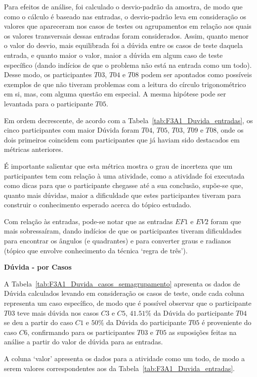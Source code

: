 Para efeitos de análise, foi calculado o desvio-padrão da amostra, de modo que como o cálculo é baseado nas entradas, o desvio-padrão leva em consideração os valores que apareceram nos casos de testes ou agrupamentos em relação aos quais os valores transversais dessas entradas foram considerados. Assim, quanto menor o valor do desvio, mais equilibrada foi a dúvida entre os casos de teste daquela entrada, e quanto maior o valor, maior a dúvida em algum caso de teste específico (dando indícios de que o problema não está na entrada como um todo). Desse modo, os participantes $T03$, $T04$ e $T08$ podem ser apontados como possíveis exemplos de que não tiveram problemas com a leitura do círculo trigonométrico em si, mas, com alguma questão em especial. A mesma hipótese pode ser levantada para o participante $T05$.

Em ordem decrescente, de acordo com a Tabela~\ref{tab:F3A1_Duvida_entradas}, os cinco participantes com maior Dúvida foram $T04$, $T05$, $T03$, $T09$ e $T08$, onde os dois primeiros coincidem com participantes que já haviam sido destacados em métricas anteriores. 

É importante salientar que esta métrica mostra o grau de incerteza que um participantes tem com relação à uma atividade, como a atividade foi executada como dicas para que o participante chegasse até a sua conclusão, supõe-se que, quanto mais dúvidas, maior a dificuldade que estes participantes tiveram para construir o conhecimento esperado acerca do tópico estudado.

Com relação às entradas, pode-se notar que as entradas $EF1$ e $EV2$ foram que mais sobressaíram, dando indícios de que os participantes tiveram dificuldades para encontrar os ângulos (e quadrantes) e para converter graus e radianos (tópico que envolve conhecimento da técnica `regra de três').
 
\textbf{Dúvida - por Casos}

A Tabela~\ref{tab:F3A1_Duvida_casos_semagrupamento} apresenta os dados de Dúvida calculados levando em consideração os casos de teste, onde cada coluna representa um caso específico, de modo que é possível observar que o participante $T03$ teve mais dúvida nos casos $C3$ e $C5$, $41.51\%$ da Dúvida do participante $T04$ se deu a partir do caso $C1$ e $50\%$ da Dúvida do participante $T05$ é proveniente do caso $C6$, confirmando para os participantes $T03$ e $T05$ as suposições feitas na análise a partir do valor de dúvida para as entradas.

A coluna `valor' apresenta os dados para a atividade como um todo, de modo a serem valores correspondentes aos da Tabela~\ref{tab:F3A1_Duvida_entradas}.

